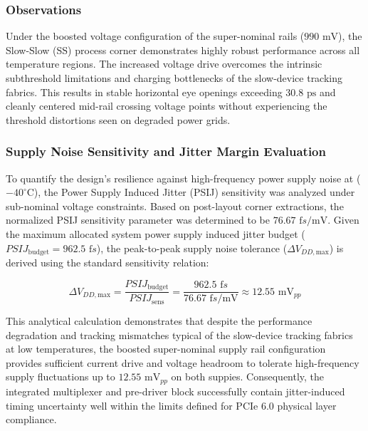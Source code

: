 \subsubsection*{ Observations}

Under the boosted voltage configuration of the super-nominal rails ($990\text{ mV}$), the Slow-Slow (SS) process corner demonstrates highly robust performance across all temperature regions. The increased voltage drive overcomes the intrinsic subthreshold limitations and charging bottlenecks of the slow-device tracking fabrics. This results in stable horizontal eye openings exceeding $30.8\text{ ps}$ and cleanly centered mid-rail crossing voltage points without experiencing the threshold distortions seen on degraded power grids.

\subsubsection*{Supply Noise Sensitivity and Jitter Margin Evaluation}

To quantify the design's resilience against high-frequency power supply noise at ($-40^{\circ}\text{C}$), the Power Supply Induced Jitter (PSIJ) sensitivity was analyzed under sub-nominal voltage constraints. Based on post-layout corner extractions, the normalized PSIJ sensitivity parameter was determined to be $76.67\text{ f}s/\text{mV}$. Given the maximum allocated system power supply induced jitter budget ($PSIJ_{\text{budget}} = 962.5\text{ f}s$), the peak-to-peak supply noise tolerance ($\Delta V_{DD,\text{max}}$) is derived using the standard sensitivity relation:

\begin{equation}
\Delta V_{DD,\text{max}} = \frac{PSIJ_{\text{budget}}}{PSIJ_{\text{sens}}} = \frac{962.5\text{ f}s}{76.67\text{ f}s/\text{mV}} \approx 12.55\text{ mV}_{pp}
\end{equation}

This analytical calculation demonstrates that despite the performance degradation and tracking mismatches typical of the slow-device tracking fabrics at low temperatures, the boosted super-nominal supply rail configuration provides sufficient current drive and voltage headroom to tolerate high-frequency supply fluctuations up to $12.55\text{ mV}_{pp}$ on both suppies. Consequently, the integrated multiplexer and pre-driver block successfully contain jitter-induced timing uncertainty well within the limits defined for PCIe 6.0 physical layer compliance.


